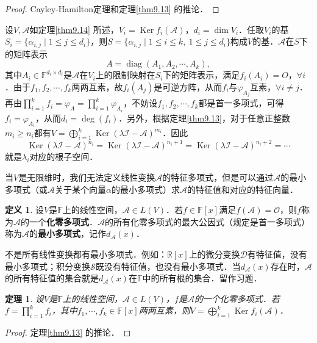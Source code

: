\documentclass[a4paper,fontset=windows]{ctexbook}
\newtheorem{theorem}{定理}[chapter]
\theoremstyle{definition}
\newtheorem{definition}{定义}[chapter]
\DeclareMathOperator{\diag}{diag}
\DeclareMathOperator{\Ker}{Ker}
\renewcommand{\le}{\leqslant}
\renewcommand{\ge}{\geqslant}
\begin{document}
\begin{proof}
Cayley-Hamilton定理和定理\ref{thm9.13} 的推论．
\end{proof}

设$V,\mathcal{A}$如定理\ref{thm9.14} 所述，$V_i=\Ker f_i(\mathcal{A})$，$d_i=\dim V_i$．任取$V_i$的基$S_i=\{\alpha_{i,j}\mid 1\le j\le d_i\}$，则$S=\{\alpha_{i,j}\mid 1\le i\le k,~1\le j\le d_i\}$构成$V$的基．$\mathcal{A}$在$S$下的矩阵表示
$$A=\diag(A_1,A_2,\cdots,A_k),$$
其中$A_i\in\mathbb{F}^{d_i\times d_i}$是$\mathcal{A}$在$V_i$上的限制映射在$S_i$下的矩阵表示，满足$f_i(A_i)=O$，$\forall i$．由于$f_1,f_2,\cdots,f_k$两两互素，故$f_i(A_j)$是可逆方阵，从而$f_i$与$\varphi_{A_j}$互素，$\forall i\ne j$．再由$\prod\limits_{i=1}^kf_i=\varphi_A=\prod\limits_{i=1}^k\varphi_{A_i}$，不妨设$f_1,f_2,\cdots,f_k$都是首一多项式，可得$f_i=\varphi_{A_i}$，从而$d_i=\deg(f_i)$．另外，根据定理\ref{thm9.13}，对于任意正整数$m_i\ge n_i$都有$V=\bigoplus\limits_{i=1}^k\Ker(\lambda\mathcal{I-A})^{m_i}$．因此
$$\Ker(\lambda\mathcal{I-A})^{n_i}=\Ker(\lambda\mathcal{I-A})^{n_i+1}=\Ker(\lambda\mathcal{I-A})^{n_i+2}=\cdots$$
就是$\lambda_i$对应的根子空间．

当$V$是无限维时，我们无法定义线性变换$\mathcal{A}$的特征多项式，但是可以通过$\mathcal{A}$的最小多项式（或$\mathcal{A}$关于某个向量$\alpha$的最小多项式）求$\mathcal{A}$的特征值和对应的特征向量．

\begin{definition}
设$V$是$\mathbb{F}$上的线性空间，$\mathcal{A}\in L(V)$．若$f\in\mathbb{F}[x]$满足$f(\mathcal{A})=\mathcal{O}$，则$f$称为$\mathcal{A}$的一个{\bf 化零多项式}．$\mathcal{A}$的所有化零多项式的最大公因式（规定是首一多项式）称为$\mathcal{A}$的{\bf 最小多项式}，记作$d_{\mathcal{A}}(x)$．
\end{definition}

不是所有线性变换都有最小多项式．例如：$\mathbb{R}[x]$上的微分变换$\mathcal{D}$有特征值，没有最小多项式；积分变换$\mathcal{S}$既没有特征值，也没有最小多项式．当$d_{\mathcal{A}}(x)$存在时，$\mathcal{A}$的所有特征值的集合就是$d_{\mathcal{A}}(x)$在$\mathbb{F}$中的所有根的集合．留作习题．

\begin{theorem}
设$V$是$\mathbb{F}$上的线性空间，$\mathcal{A}\in L(V)$，$f$是$\mathcal{A}$的一个化零多项式．若$f=\prod\limits_{i=1}^kf_i$，其中$f_1,\cdots,f_k\in\mathbb{F}[x]$两两互素，则$V=\bigoplus\limits_{i=1}^k\Ker f_i(\mathcal{A})$．
\end{theorem}

\begin{proof}
定理\ref{thm9.13} 的推论．
\end{proof}
\end{document}

